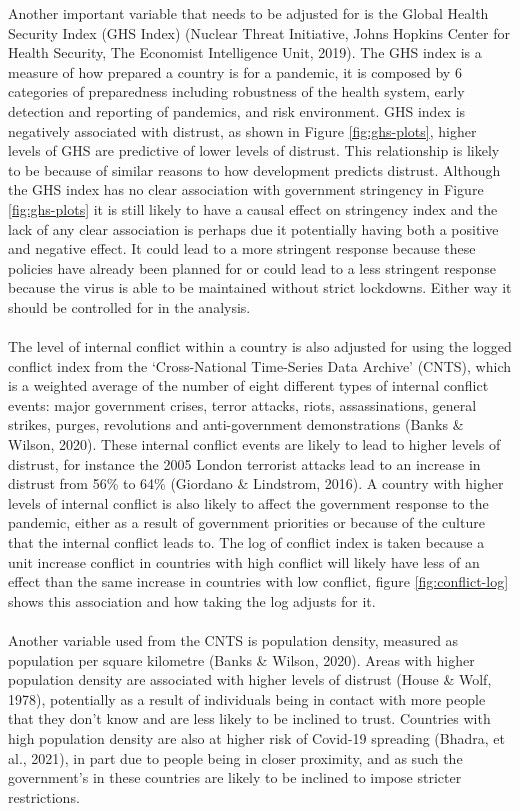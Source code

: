 \documentclass[
  11pt,
]{article}
\begin{document}
Another important variable that needs to be adjusted for is the Global Health Security Index (GHS Index) (Nuclear Threat Initiative, Johns Hopkins Center for Health Security, The Economist Intelligence Unit, 2019). The GHS index is a measure of how prepared a country is for a pandemic, it is composed by 6 categories of preparedness including robustness of the health system, early detection and reporting of pandemics, and risk environment. GHS index is negatively associated with distrust, as shown in Figure \ref{fig:ghs-plots}, higher levels of GHS are predictive of lower levels of distrust. This relationship is likely to be because of similar reasons to how development predicts distrust. Although the GHS index has no clear association with government stringency in Figure \ref{fig:ghs-plots} it is still likely to have a causal effect on stringency index and the lack of any clear association is perhaps due it potentially having both a positive and negative effect. It could lead to a more stringent response because these policies have already been planned for or could lead to a less stringent response because the virus is able to be maintained without strict lockdowns. Either way it should be controlled for in the analysis.\\
~\\
The level of internal conflict within a country is also adjusted for using the logged conflict index from the `Cross-National Time-Series Data Archive' (CNTS), which is a weighted average of the number of eight different types of internal conflict events: major government crises, terror attacks, riots, assassinations, general strikes, purges, revolutions and anti-government demonstrations (Banks \& Wilson, 2020). These internal conflict events are likely to lead to higher levels of distrust, for instance the 2005 London terrorist attacks lead to an increase in distrust from 56\% to 64\% (Giordano \& Lindstrom, 2016). A country with higher levels of internal conflict is also likely to affect the government response to the pandemic, either as a result of government priorities or because of the culture that the internal conflict leads to. The log of conflict index is taken because a unit increase conflict in countries with high conflict will likely have less of an effect than the same increase in countries with low conflict, figure \ref{fig:conflict-log} shows this association and how taking the log adjusts for it.\\
~\\
Another variable used from the CNTS is population density, measured as population per square kilometre (Banks \& Wilson, 2020). Areas with higher population density are associated with higher levels of distrust (House \& Wolf, 1978), potentially as a result of individuals being in contact with more people that they don't know and are less likely to be inclined to trust. Countries with high population density are also at higher risk of Covid-19 spreading (Bhadra, et al., 2021), in part due to people being in closer proximity, and as such the government's in these countries are likely to be inclined to impose stricter restrictions.\\
\end{document}

